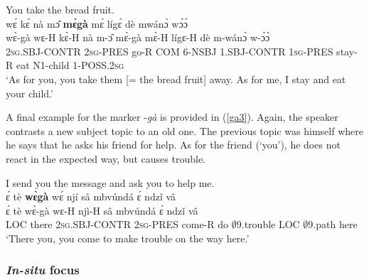 \begin{exe} 
\ex\label{ga2} You take the bread fruit.\\
   wɛ́ kɛ́ nà mɔ̂ {\bfseries mɛ̀gà} mɛ́ lígɛ́ dè mwánɔ̀ wɔ́ɔ̀\\
       wɛ̀-gà wɛ-H kɛ̀-H nà m-ɔ̂ mɛ̀-gà mɛ̀-H lígɛ-H dè m-wánɔ̀ w-ɔ́ɔ̀\\
         2\textsc{sg}.SBJ-CONTR 2\textsc{sg}-PRES go-R COM 6-NSBJ 1.SBJ-CONTR 1\textsc{sg}-PRES stay-R eat N1-child 1-POSS.2\textsc{sg}\\
    \trans `As for you, you take them [= the bread fruit] away. As for me, I stay and eat your child.'
\end{exe}



A final example for the marker -{\itshape gà} is provided in (\ref{ga3}). Again, the speaker contrasts a new subject topic to an old one. The previous topic was himself where he says that he asks his friend for help. As for the friend (`you'), he does not react in the expected way, but causes trouble.

\begin{exe} 
\ex\label{ga3} I send you the message and ask you to help me.\\
  \glll ɛ́ tè {\bfseries wɛ̀gà} wɛ́ njí sâ mbvúndá ɛ́ ndzǐ vâ\\
        ɛ́ tè wɛ̀-gà wɛ-H njì-H sâ mbvúndá ɛ́ ndzǐ vâ\\
        LOC there 2\textsc{sg}.SBJ-CONTR 2\textsc{sg}-PRES come-R do $\emptyset$9.trouble LOC $\emptyset$9.path here\\
    \trans `There you, you come to make trouble on the way here.'
\end{exe}





\subsubsection{{\itshape In-situ} focus}
\label{sec:insitu}

